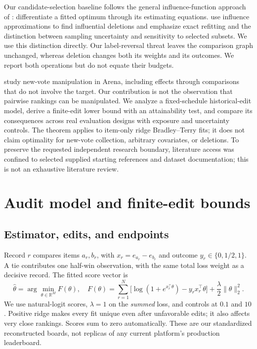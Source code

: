 \documentclass{article}
\newcommand{\R}{\mathbb R}
\begin{document}
Our candidate-selection baseline follows the general influence-function approach of \citet{koh2017influence}: differentiate a fitted optimum through its estimating equations. \citet{broderick2023robustness} use influence approximations to find influential deletions and emphasize exact refitting and the distinction between sampling uncertainty and sensitivity to selected subsets. We use this distinction directly. Our label-reversal threat leaves the comparison graph unchanged, whereas deletion changes both its weights and its outcomes. We report both operations but do not equate their budgets.

\citet{min2025rigging} study new-vote manipulation in Arena, including effects through comparisons that do not involve the target. Our contribution is not the observation that pairwise rankings can be manipulated. We analyze a fixed-schedule historical-edit model, derive a finite-edit lower bound with an attainability test, and compare its consequences across real evaluation designs with exposure and uncertainty controls. The theorem applies to item-only ridge Bradley--Terry fits; it does not claim optimality for new-vote collection, arbitrary covariates, or deletions. To preserve the requested independent research boundary, literature access was confined to selected supplied starting references and dataset documentation; this is not an exhaustive literature review.

\section{Audit model and finite-edit bounds}
\label{sec:method}
\subsection{Estimator, edits, and endpoints}
Record $r$ compares items $a_r,b_r$, with $x_r=e_{a_r}-e_{b_r}$ and outcome $y_r\in\{0,1/2,1\}$. A tie contributes one half-win observation, with the same total loss weight as a decisive record. The fitted score vector is
\begin{equation}
 \hat\theta=\arg\min_{\theta\in\R^M}F(\theta),\quad
 F(\theta)=\sum_{r=1}^N\big[\log(1+e^{x_r^\top\theta})-y_rx_r^\top\theta\big]
       +\frac{\lambda}{2}\|\theta\|_2^2. \label{eq:model}
\end{equation}
We use natural-logit scores, $\lambda=1$ on the \emph{summed} loss, and controls at $0.1$ and $10$. Positive ridge makes every fit unique even after unfavorable edits; it also affects very close rankings. Scores sum to zero automatically. These are our standardized reconstructed boards, not replicas of any current platform's production leaderboard.
\end{document}
